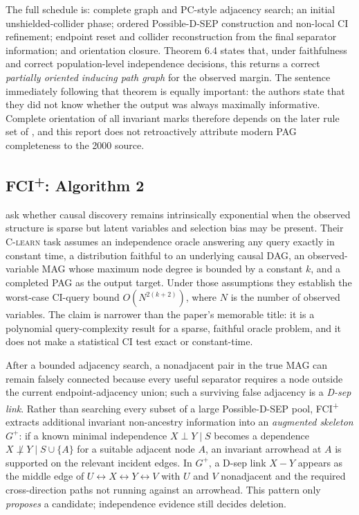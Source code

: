 \documentclass[11pt,a4paper]{article}
\newcommand{\FCIplus}{FCI\textsuperscript{+}}
\begin{document}
The full schedule is: complete graph and PC-style adjacency search; an initial
unshielded-collider phase; ordered Possible-D-SEP construction and non-local CI
refinement; endpoint reset and collider reconstruction from the final separator
information; and orientation closure. Theorem 6.4 states that, under
faithfulness and correct population-level independence decisions, this returns a
correct \emph{partially oriented inducing path graph} for the observed margin.
The sentence immediately following that theorem is equally important: the
authors state that they did not know whether the output was always maximally
informative. Complete orientation of all invariant marks therefore depends on
the later rule set of \citet{zhang2008completeness}, and this report does not
retroactively attribute modern PAG completeness to the 2000 source.

\subsection{\FCIplus{}: Algorithm 2}

\citet{claassen2013learning} ask whether causal discovery remains intrinsically
exponential when the observed structure is sparse but latent variables and
selection bias may be present. Their C-\textsc{learn} task assumes an
independence oracle answering any query exactly in constant time, a
distribution faithful to an underlying causal DAG, an observed-variable MAG
whose maximum node degree is bounded by a constant \(k\), and a completed PAG
as the output target. Under those assumptions they establish the worst-case
CI-query bound \(O(N^{2(k+2)})\), where \(N\) is the number of observed
variables. The claim is narrower than the paper's memorable title: it is a
polynomial query-complexity result for a sparse, faithful oracle problem, and
it does not make a statistical CI test exact or constant-time.

After a bounded adjacency search, a nonadjacent pair in the true MAG can remain
falsely connected because every useful separator requires a node outside the
current endpoint-adjacency union; such a surviving false adjacency is a
\emph{D-sep link}. Rather than searching every subset of a large Possible-D-SEP
pool, \FCIplus{} extracts additional invariant non-ancestry information into an
\emph{augmented skeleton} \(G^{+}\): if a known minimal independence
\(X \perp Y \mid S\) becomes a dependence \(X \not\perp Y \mid S \cup \{A\}\)
for a suitable adjacent node \(A\), an invariant arrowhead at \(A\) is
supported on the relevant incident edges. In \(G^{+}\), a D-sep link
\(X - Y\) appears as the middle edge of \(U \leftrightarrow X \leftrightarrow Y
\leftrightarrow V\) with \(U\) and \(V\) nonadjacent and the required
cross-direction paths not running against an arrowhead. This pattern only
\emph{proposes} a candidate; independence evidence still decides deletion.
\end{document}
